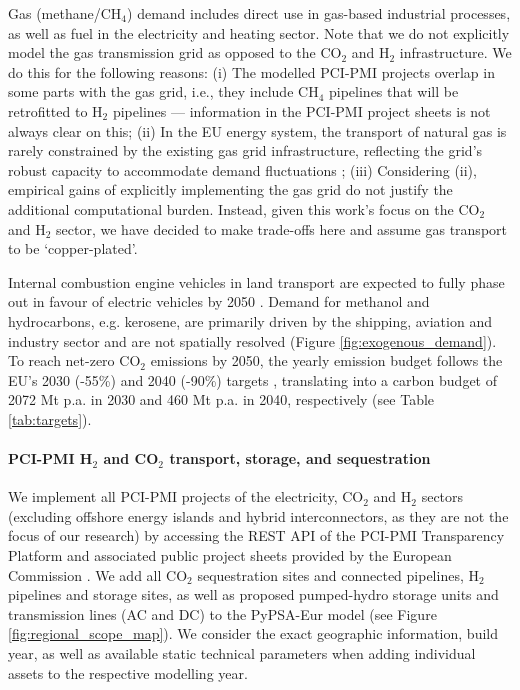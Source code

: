 \documentclass[pdflatex,sn-nature]{sn-jnl}%
\theoremstyle{thmstyleone}%
\theoremstyle{thmstyletwo}%
\theoremstyle{thmstylethree}%
\begin{document}
Gas (methane/CH$_4$) demand includes direct use in gas-based industrial processes, as well as fuel in the electricity and heating sector. Note that we do not explicitly model the gas transmission grid as opposed to the CO$_2$ and H$_2$ infrastructure. We do this for the following reasons: (i) The modelled PCI-PMI projects overlap in some parts with the gas grid, i.e., they include CH$_4$ pipelines that will be retrofitted to H$_2$ pipelines --- information in the PCI-PMI project sheets is not always clear on this; (ii) In the EU energy system, the transport of natural gas is rarely constrained by the existing gas grid infrastructure, reflecting the grid's robust capacity to accommodate demand fluctuations \cite{riepinModellingUncertaintyCoupled2021}; (iii) Considering (ii), empirical gains of explicitly implementing the gas grid do not justify the additional computational burden. 
Instead, given this work's focus on the CO$_2$ and H$_2$ sector, we have decided to make trade-offs here and assume gas transport to be `copper-plated'.

Internal combustion engine vehicles in land transport are expected to fully phase out in favour of electric vehicles by 2050 \cite{zeyenShiftingBurdensHow2025a}. Demand for methanol and hydrocarbons, e.g. kerosene, are primarily driven by the shipping, aviation and industry sector and are not spatially resolved (Figure \ref{fig:exogenous_demand}).
To reach net-zero CO$_2$ emissions by 2050, the yearly emission budget follows the EU's 2030 (-55\%) and 2040 (-90\%) targets \cite{europeancommissionFit55Delivering2021, europeancommission.directorategeneralforclimateaction.IndepthReportResults2024}, translating into a carbon budget of 2072 Mt p.a. in 2030 and 460 Mt p.a. in 2040, respectively (see Table \ref{tab:targets}).

\paragraph{PCI-PMI H$_2$ and CO$_2$ transport, storage, and sequestration}

We implement all PCI-PMI projects of the electricity, CO$_2$ and H$_2$ sectors (excluding offshore energy islands and hybrid interconnectors, as they are not the focus of our research) by accessing the REST API of the PCI-PMI Transparency Platform and associated public project sheets provided by the European Commission \cite{europeancommissionPCIPMITransparencyPlatform2024}. We add all CO$_2$ sequestration sites and connected pipelines, H$_2$ pipelines and storage sites, as well as proposed pumped-hydro storage units and transmission lines (AC and DC) to the PyPSA-Eur model (see Figure \ref{fig:regional_scope_map}). We consider the exact geographic information, build year, as well as available static technical parameters when adding individual assets to the respective modelling year. 
\end{document}

